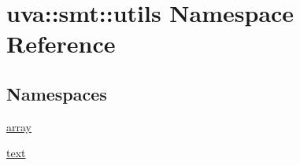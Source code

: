 \hypertarget{namespaceuva_1_1smt_1_1utils}{}\section{uva\+:\+:smt\+:\+:utils Namespace Reference}
\label{namespaceuva_1_1smt_1_1utils}
\subsection*{Namespaces}
\begin{DoxyCompactItemize}
\item 
 \hyperlink{namespaceuva_1_1smt_1_1utils_1_1array}{array}
\item 
 \hyperlink{namespaceuva_1_1smt_1_1utils_1_1text}{text}
\end{DoxyCompactItemize}
